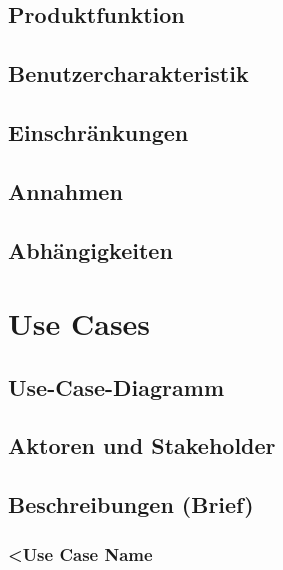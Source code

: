 \documentclass[a4paper]{article}
\let\oldsection\section
\renewcommand\section{\clearpage\oldsection}
\begin{document}
\subsection{Produktfunktion}

\subsection{Benutzercharakteristik}

\subsection{Einschränkungen}

\subsection{Annahmen}

\subsection{Abhängigkeiten}

\pagebreak
\section{Use Cases}

\subsection{Use-Case-Diagramm}

\subsection{Aktoren und Stakeholder}

\subsection{Beschreibungen (Brief)}

\subsubsection{<Use Case Name}
\end{document}
